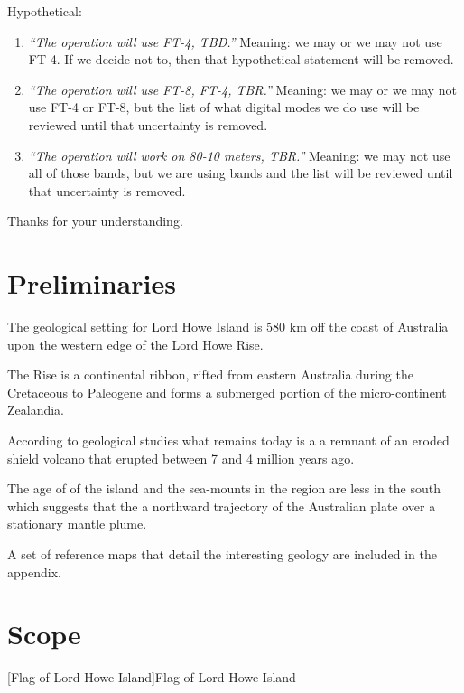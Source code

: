 \documentclass[11pt]{article}
\begin{document}
Hypothetical:
\par
\begin{enumerate}
\item {\textit{``The operation will use FT-4, TBD.''}}   Meaning: we may or we may not use FT-4.  If we decide not to, then that hypothetical statement will be removed.
\item {\textit{``The operation will use FT-8, FT-4, TBR.''}}   Meaning: we may or we may not use FT-4 or FT-8, but the list of what digital modes we do use
will be reviewed until that uncertainty is removed.
\item {\textit{``The operation will work on 80-10 meters, TBR.''}}  Meaning: we may not use all of those bands, but we are using bands and the list will be reviewed until that uncertainty is removed.
\end{enumerate}
\par
Thanks for your understanding.

\newpage
\section{Preliminaries}

The geological setting for Lord Howe Island is 580 km off the coast
of Australia upon the western edge of the Lord Howe Rise.

\par
The Rise is a continental ribbon, rifted from eastern 
Australia during the Cretaceous to Paleogene and
forms a submerged portion of the micro-continent
Zealandia.\cite{lhi}
\par
According to geological studies what remains today is a 
a remnant of an eroded shield volcano that 
erupted between 7 and 4 million years ago. 
\par
The age of of the island and the sea-mounts in the region are less in the
south which suggests that the a northward trajectory of the Australian plate
over a stationary mantle plume.
\par

A set of reference maps that detail the interesting geology are included
in the appendix.


\section{Scope}

\vskip2mm
\noindent%
\begin{minipage}{\linewidth}%
\captionsetup{width=0.8\linewidth}
[Flag of Lord Howe Island]{Flag of Lord Howe Island}
\label{flag}
\end{minipage}
\vskip5mm
\end{document}
